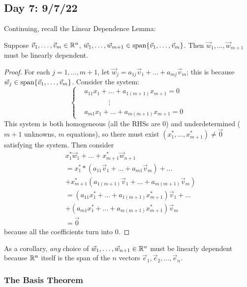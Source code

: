 \documentclass[main.tex]{subfiles}
\begin{document}
\subsection{Day 7: 9/7/22}
Continuing, recall the Linear Dependence Lemma:

\begin{theorem}
    Suppose $\vec{v}_1, \ldots , \vec{v}_m\in \mathbb R^n$, $\vec{w}_1, \ldots , \vec{w}_{m + 1} \in \operatorname{span}\{\vec{v}_1, \ldots , \vec{v}_m\}$. Then $\vec{w}_1, \ldots , \vec{w}_{m + 1}$ must be linearly dependent.
\end{theorem}

\begin{proof}
    For each $j = 1, \ldots , m + 1$, let $\vec{w}_j = a_{1j}\vec{v}_1 + \ldots + a_{mj}\vec{v}_m$; this is because $\vec{w}_j \in \operatorname{span}\{\vec{v}_1, \ldots , \vec{v}_m\}$. Consider the system:
    \[\left\{\begin{aligned}
        &a_{11}x_1 + \ldots + a_{1(m + 1)}x_{m + 1} = 0 \\
        &\phantom{hey guys}\vdots \\
        &a_{m1}x_1 + \ldots + a_{m(m + 1)}x_{m + 1} = 0
    \end{aligned}\right.\]
    This system is both homogeneous (all the RHSs are $0$) and underdetermined ($m + 1$ unknowns, $m$ equations), so there must exist $(x_1^*, \ldots , x^*_{m + 1})\neq \vec{0}$ satisfying the system. Then consider 
    \begin{align*}
    &x^*_1\vec{w}_1 + \ldots + x^*_{m + 1}\vec{w}_{n + 1} \\
    &= x^*_1*(a_{11}\vec{v}_1 + \ldots + a_{m1}\vec{v}_m) + \ldots \\
    &+ x^*_{m + 1}(a_{1(m + 1)}\vec{v}_1 + \ldots + a_{m(m + 1)}\vec{v}_m) \\
    &= (a_{11}x^*_1 + \ldots + a_{1(m + 1)}x^*_{m + 1})\vec{v}_1 + \ldots \\
    &+ (a_{m1}x^*_1 + \ldots + a_{m(m + 1)}x^*_{m + 1})\vec{v}_m \\
    &= \vec{0}
    \end{align*}
    because all the coefficients turn into $0$.
\end{proof}

As a corollary, \textit{any} choice of $\vec{w}_1, \ldots , \vec{w}_{n + 1}\in \mathbb R^n$ must be linearly dependent because $\mathbb R^n$ itself is the span of the $n$ vectors $\vec{e}_1, \vec{e}_2, \ldots , \vec{e}_n$.

\subsubsection{The Basis Theorem}
\end{document}

